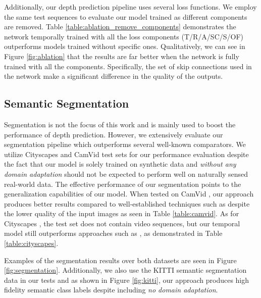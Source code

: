 \documentclass[10pt,twocolumn,letterpaper]{article}
\begin{document}
{Additionally, our depth prediction pipeline uses several loss functions. We employ the same test sequences to evaluate our model trained as different components are removed. Table \ref{table:ablation_remove_components} demonstrates the network temporally trained with all the loss components (T/R/A/SC/S/OF) outperforms models trained without specific ones. Qualitatively, we can see in Figure \ref{fig:ablation} that the results are far better when the network is fully trained with all the components. Specifically, the set of skip connections used in the network make a significant difference in the quality of the outputs.\vspace{-0.1cm}

\subsection{Semantic Segmentation}
\label{ssec:segmentation_results}\vspace{-0.1cm}

Segmentation is not the focus of this work and is mainly used to boost the performance of depth prediction. However, we extensively evaluate our segmentation pipeline which outperforms several well-known comparators. We utilize Cityscapes \cite{cordts2016cityscapes} and CamVid \cite{brostow2009semantic} test sets for our performance evaluation despite the fact that our model is solely trained on synthetic data and \textit{without any domain adaptation} should not be expected to perform well on naturally sensed real-world data. The effective performance of our segmentation points to the generalization capabilities of our model. When tested on CamVid \cite{brostow2009semantic}, our approach produces better results compared to well-established techniques such as \cite{badrinarayanan2015segnet, kendall2017bayesian, noh2015learning, visin2016reseg} despite the lower quality of the input images as seen in Table \ref{table:camvid}. As for Cityscapes \cite{cordts2016cityscapes}, the test set does not contain video sequences, but our temporal model still outperforms approaches such as \cite{chen2018deeplab, liu2015semantic, long2015fully, uhrig2016pixel, zheng2015conditional}, as demonstrated in Table \ref{table:cityscapes}.

Examples of the segmentation results over both datasets are seen in Figure \ref{fig:segmentation}. Additionally, we also use the KITTI semantic segmentation data \cite{Alhaija2018IJCV} in our tests and as shown in Figure \ref{fig:kitti}, our approach produces high fidelity semantic class labels despite including \textit{no domain adaptation}.\vspace{-0.2cm}

}
\end{document}

